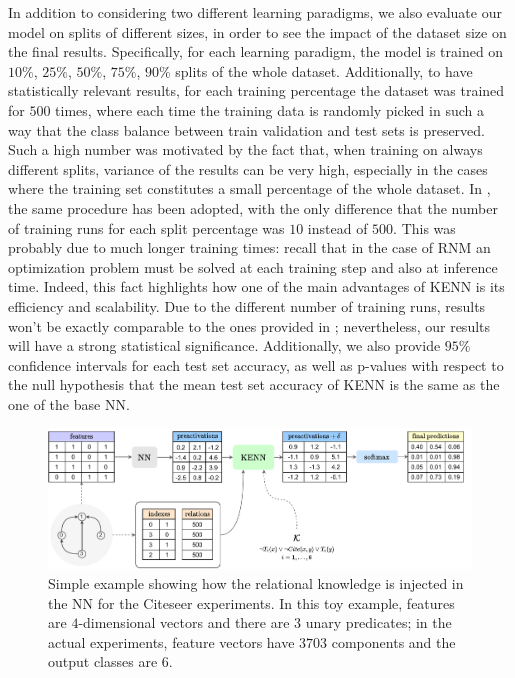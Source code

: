 In addition to considering two different learning paradigms, we also evaluate our model on splits of different sizes, in order to see the impact of the dataset size on the final results. Specifically, for each learning paradigm, the model is trained on $10\%$, $25\%$, $50\%$, $75\%$, $90\%$ splits of the whole dataset. Additionally, to have statistically relevant results, for each training percentage the dataset was trained for $500$ times, where each time the training data is randomly picked in such a way that the class balance between train validation and test sets is preserved. Such a high number was motivated by the fact that, when training on always different splits, variance of the results can be very high, especially in the cases where the training set constitutes a small percentage of the whole dataset. In \cite{marra2020relational}, the same procedure has been adopted, with the only difference that the number of training runs for each split percentage was $10$ instead of $500$. This was probably due to much longer training times: recall that in the case of RNM an optimization problem must be solved at each training step and also at inference time. Indeed, this fact highlights how one of the main advantages of KENN is its efficiency and scalability. Due to the different number of training runs, results won't be exactly comparable to the ones provided in \cite{marra2020relational}; nevertheless, our results will have a strong statistical significance. Additionally, we also provide $95\%$ confidence intervals for each test set accuracy, as well as \mbox{p-values} with respect to the null hypothesis that the mean test set accuracy of KENN is the same as the one of the base NN.

\begin{figure}
	\centering
	\includegraphics[width=\linewidth]{figures/citeseer_setup.drawio.pdf}
	\caption{Simple example showing how the relational knowledge is injected in the NN for the Citeseer experiments. In this toy example, features are $4$-dimensional vectors and there are $3$ unary predicates; in the actual experiments, feature vectors have $3703$ components and the output classes are $6$.}
	\label{fig:citeseer_setup_chart}
\end{figure}


